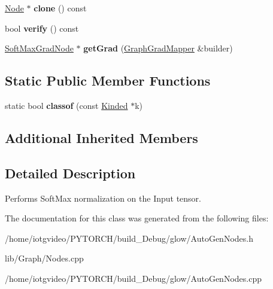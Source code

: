 \begin{DoxyCompactItemize}
\hyperlink{classglow_1_1_node}{Node} $\ast$ {\bfseries clone} () const
\item 
\mbox{\label{classglow_1_1_soft_max_node_a719d848cb43712bdc962963f40b89433}} 
bool {\bfseries verify} () const
\item 
\mbox{\label{classglow_1_1_soft_max_node_accb4d1fb287ade240df2382d5227fa6d}} 
\hyperlink{classglow_1_1_soft_max_grad_node}{Soft\+Max\+Grad\+Node} $\ast$ {\bfseries get\+Grad} (\hyperlink{classglow_1_1_graph_grad_mapper}{Graph\+Grad\+Mapper} \&builder)
\end{DoxyCompactItemize}
\subsection*{Static Public Member Functions}
\begin{DoxyCompactItemize}
\item 
\mbox{\label{classglow_1_1_soft_max_node_a52e159d4338f0643b8615caa96c26a89}} 
static bool {\bfseries classof} (const \hyperlink{classglow_1_1_kinded}{Kinded} $\ast$k)
\end{DoxyCompactItemize}
\subsection*{Additional Inherited Members}


\subsection{Detailed Description}
Performs Soft\+Max normalization on the Input tensor. 

The documentation for this class was generated from the following files\+:\begin{DoxyCompactItemize}
\item 
/home/iotgvideo/\+P\+Y\+T\+O\+R\+C\+H/build\+\_\+\+Debug/glow/Auto\+Gen\+Nodes.\+h\item 
lib/\+Graph/Nodes.\+cpp\item 
/home/iotgvideo/\+P\+Y\+T\+O\+R\+C\+H/build\+\_\+\+Debug/glow/Auto\+Gen\+Nodes.\+cpp\end{DoxyCompactItemize}
